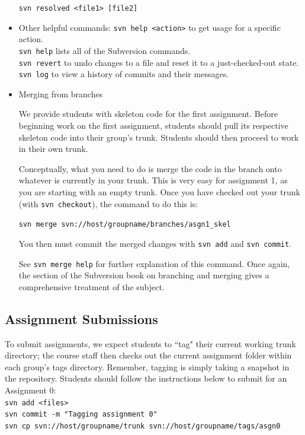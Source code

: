 \begin{itemize}
\texttt{svn resolved <file1> [file2]}

\item Other helpful commands:
\noindent \texttt{svn help <action>} to get usage for a specific action.\\
\noindent \texttt{svn help} lists all of the Subversion commands.\\
\noindent \texttt{svn revert} to undo changes to a file and reset it to a just-checked-out state.
\noindent \texttt{svn log} to view a history of commits and their messages. 

\item Merging from branches

We provide students with skeleton code for the first assignment. Before beginning work on the first assignment, students should pull its respective skeleton code into their group's trunk. Students should then proceed to work in their own trunk.

Conceptually, what you need to do is merge the code in the branch onto whatever is currently in your trunk. This is very easy for assignment 1, as you are starting with an empty trunk. Once you have checked out your trunk (with \texttt{svn checkout}), the command to do this is:

\texttt{svn merge svn://host/groupname/branches/asgn1\_skel}

You then must commit the merged changes with \texttt{svn add} and \texttt{svn commit}.

See \texttt{svn merge help} for further explanation of this command. Once again, the section of the Subversion book on branching and merging gives a comprehensive treatment of the subject.

\end{itemize}

\subsection{Assignment Submissions}

To submit assignments, we expect students to ``tag" their current working trunk directory; the course staff then checks out the current assignment folder within each group's tags directory. Remember, tagging is simply taking a snapshot in the repository. Students should follow the instructions below to submit for an Assignment 0:\\
\texttt{svn add <files>}\\
\texttt{svn commit -m "Tagging assignment 0"}\\
\texttt{svn cp svn://host/groupname/trunk svn://host/groupname/tags/asgn0}\\


